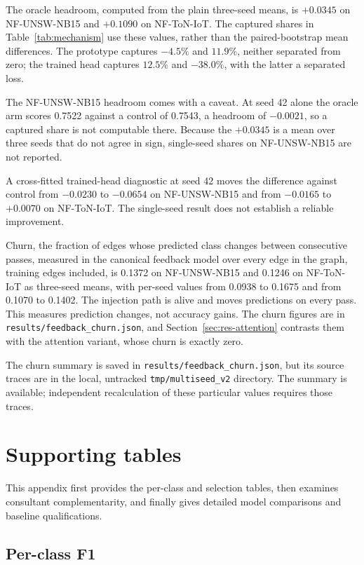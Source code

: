 The oracle headroom, computed from the plain three-seed means, is $+0.0345$ on NF-UNSW-NB15 and $+0.1090$ on NF-ToN-IoT. The captured shares in Table~\ref{tab:mechanism} use these values, rather than the paired-bootstrap mean differences. The prototype captures $-4.5\%$ and $11.9\%$, neither separated from zero; the trained head captures $12.5\%$ and $-38.0\%$, with the latter a separated loss.

The NF-UNSW-NB15 headroom comes with a caveat. At seed 42 alone the oracle arm scores
0.7522 against a control of 0.7543, a headroom of $-0.0021$, so a captured share is not
computable there. Because the $+0.0345$ is a mean over three seeds that do not agree in sign,
single-seed shares on NF-UNSW-NB15 are not reported.

A cross-fitted trained-head diagnostic at seed 42 moves the difference against control from $-0.0230$ to $-0.0654$ on NF-UNSW-NB15 and from $-0.0165$ to $+0.0070$ on NF-ToN-IoT. The single-seed result does not establish a reliable improvement.

Churn, the fraction of edges whose predicted class changes
between consecutive passes, measured in the canonical feedback model over every edge in the graph,
training edges included, is 0.1372 on NF-UNSW-NB15 and 0.1246 on NF-ToN-IoT as three-seed means,
with per-seed values from 0.0938 to 0.1675 and from 0.1070 to 0.1402. The injection path is
alive and moves predictions on every pass. This measures prediction changes, not accuracy gains. The churn figures are in
\texttt{results/feedback\_churn.json}, and Section~\ref{sec:res-attention} contrasts them with the
attention variant, whose churn is exactly zero.

The churn summary is saved in \texttt{results/feedback\_churn.json}, but its source traces are in the local, untracked \texttt{tmp/multiseed\_v2} directory. The summary is available; independent recalculation of these particular values requires those traces.

\clearpage
\section{Supporting tables}
\label{app:tables}

This appendix first provides the per-class and selection tables, then examines consultant complementarity, and finally gives detailed model comparisons and baseline qualifications.

\FloatBarrier
\subsection{Per-class F1}
\label{app:perclass}

